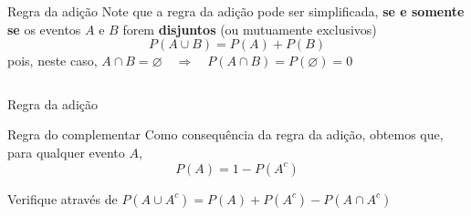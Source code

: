 \documentclass[10pt]{beamer}\usepackage[]{graphicx}\usepackage[]{color}
\theoremstyle{definition}
\begin{document}
\begin{frame}[fragile]{Regra da adição}
  Note que a regra da adição pode ser simplificada, \textbf{se e somente
    se} os eventos $A$ e $B$ forem \textbf{disjuntos} (ou mutuamente
  exclusivos)
    \begin{equation*}
      P(A \cup B) = P(A) + P(B)
    \end{equation*}
    pois, neste caso, $A \cap B = \varnothing \quad \Rightarrow \quad
    P(A \cap B) = P(\varnothing) = 0$
  \vspace{1em}
\def\firstcircle{(0,0) circle (1.0cm)}
\def\secondcircle{(0:2.25cm) circle (1.0cm)}



  \begin{columns}[c]
    \centering
    \centering
  \end{columns}
\end{frame}

\begin{frame}[fragile]{Regra da adição}
  \begin{block}{Regra do complementar}
    Como consequência da regra da adição, obtemos que, para qualquer
    evento $A$,
    \begin{equation*}
      P(A) = 1 - P(A^c)
    \end{equation*}
  \end{block}
  \vspace{1em}
  Verifique através de $P(A \cup A^c) = P(A) + P(A^c) - P(A \cap A^c)$
\end{frame}
\end{document}
